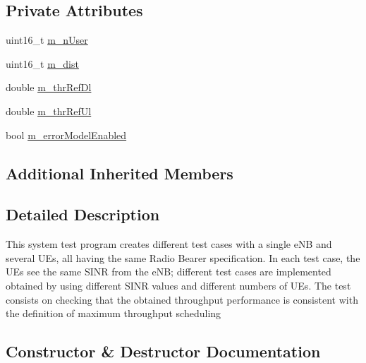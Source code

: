 \subsection*{Private Attributes}
\begin{DoxyCompactItemize}
\item 
uint16\+\_\+t \hyperlink{classLenaFdMtFfMacSchedulerTestCase_ad37e35252bb964ef3416fc10774ed9d1}{m\+\_\+n\+User}
\item 
uint16\+\_\+t \hyperlink{classLenaFdMtFfMacSchedulerTestCase_a10d998134a542e3dc4a5d22f80a786b2}{m\+\_\+dist}
\item 
double \hyperlink{classLenaFdMtFfMacSchedulerTestCase_a0a714975a52d9d2932dbc9791780becc}{m\+\_\+thr\+Ref\+Dl}
\item 
double \hyperlink{classLenaFdMtFfMacSchedulerTestCase_ac477368e603c067d75d99c896af8d49d}{m\+\_\+thr\+Ref\+Ul}
\item 
bool \hyperlink{classLenaFdMtFfMacSchedulerTestCase_ae414c4b16c3f30541fe039107be35095}{m\+\_\+error\+Model\+Enabled}
\end{DoxyCompactItemize}
\subsection*{Additional Inherited Members}


\subsection{Detailed Description}
This system test program creates different test cases with a single e\+NB and several U\+Es, all having the same Radio Bearer specification. In each test case, the U\+Es see the same S\+I\+NR from the e\+NB; different test cases are implemented obtained by using different S\+I\+NR values and different numbers of U\+Es. The test consists on checking that the obtained throughput performance is consistent with the definition of maximum throughput scheduling 

\subsection{Constructor \& Destructor Documentation}
